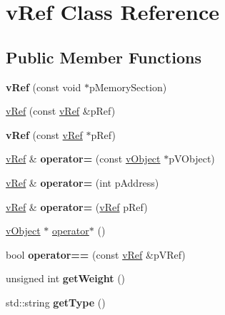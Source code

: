 \hypertarget{classv_ref}{\section{v\-Ref Class Reference}
\label{classv_ref}
}
\subsection*{Public Member Functions}
\begin{DoxyCompactItemize}
\item 
\hypertarget{classv_ref_a42661b55fdd6d60c1b7d34fec5dc6ebb}{{\bfseries v\-Ref} (const void $\ast$p\-Memory\-Section)}\label{classv_ref_a42661b55fdd6d60c1b7d34fec5dc6ebb}

\item 
\hyperlink{classv_ref_a665fe2849fbbabcb1930128b78c144ff}{v\-Ref} (const \hyperlink{classv_ref}{v\-Ref} \&p\-Ref)
\item 
\hypertarget{classv_ref_a6824b37064baf1055c0634d25af33302}{{\bfseries v\-Ref} (const \hyperlink{classv_ref}{v\-Ref} $\ast$p\-Ref)}\label{classv_ref_a6824b37064baf1055c0634d25af33302}

\item 
\hypertarget{classv_ref_a6fdd2c2154bfe2a436684b0a4d8dc44c}{\hyperlink{classv_ref}{v\-Ref} \& {\bfseries operator=} (const \hyperlink{classv_object}{v\-Object} $\ast$p\-V\-Object)}\label{classv_ref_a6fdd2c2154bfe2a436684b0a4d8dc44c}

\item 
\hypertarget{classv_ref_a09a2b66a31121f2ea39db1d2275df018}{\hyperlink{classv_ref}{v\-Ref} \& {\bfseries operator=} (int p\-Address)}\label{classv_ref_a09a2b66a31121f2ea39db1d2275df018}

\item 
\hypertarget{classv_ref_a7a5795eb3d07af12a724006868ed28ba}{\hyperlink{classv_ref}{v\-Ref} \& {\bfseries operator=} (\hyperlink{classv_ref}{v\-Ref} p\-Ref)}\label{classv_ref_a7a5795eb3d07af12a724006868ed28ba}

\item 
\hyperlink{classv_object}{v\-Object} $\ast$ \hyperlink{classv_ref_a8c6c503ee26c2e26bbf336166992f79c}{operator$\ast$} ()
\item 
\hypertarget{classv_ref_a67f7a5cc022f60bfe5a6d1069d97a455}{bool {\bfseries operator==} (const \hyperlink{classv_ref}{v\-Ref} \&p\-V\-Ref)}\label{classv_ref_a67f7a5cc022f60bfe5a6d1069d97a455}

\item 
\hypertarget{classv_ref_a82bfa187c785c2044dde59aa8d993c6a}{unsigned int {\bfseries get\-Weight} ()}\label{classv_ref_a82bfa187c785c2044dde59aa8d993c6a}

\item 
\hypertarget{classv_ref_a29f102a40b30f7662de769fd07f42f0c}{std\-::string {\bfseries get\-Type} ()}\label{classv_ref_a29f102a40b30f7662de769fd07f42f0c}

\end{DoxyCompactItemize}
